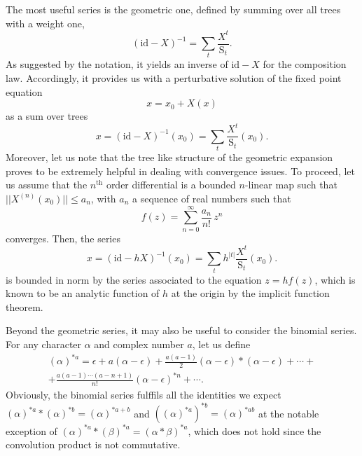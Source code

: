 \documentclass[12pt,here,feynmf]{article}
\begin{document}
The most useful series is the geometric one, defined by summing over all trees with a weight one, 
\begin{equation}
(\mathrm{id}-X)^{-1}=\sum_{t}\frac{X^{t}}{\mathrm{S}_{t}}. \label{geometrictree}
\end{equation}
As suggested by the notation, it yields an inverse of $\mathrm{id}-X$ for the composition law. Accordingly, it provides us with a perturbative solution of the fixed point equation
\begin{equation}
x=x_{0}+X(x)\label{fixedpoint}
\end{equation}
as a sum over trees
\begin{equation}
 x=(\mathrm{id}-X)^{-1}(x_{0})=\sum_{t}\frac{X^{t}}{\mathrm{S}_{t}}(x_{0}).
\end{equation}
Moreover, let us note that the tree like structure of the geometric expansion proves to be extremely helpful in dealing with convergence issues. To proceed, let us assume that the $n^{\mathrm{th}}$ order differential is  a bounded $n$-linear map such that $||X^{(n)}(x_{0})||\leq a_{n}$, with $a_{n}$ a sequence of real numbers such that
\begin{equation}
f(z)=\sum_{n=0}^{\infty}\frac{a_{n}}{n!}\,z^{n}
\end{equation}
converges. Then, the series 
\begin{equation}
 x=(\mathrm{id}-hX)^{-1}(x_{0})=\sum_{t}h^{|t|}\frac{X^{t}}{\mathrm{S}_{t}}(x_{0}).
\end{equation}
is bounded in norm by the series associated to the equation $z=hf(z)$, which is known to be an analytic function of $h$ at the origin by the implicit function theorem. 

Beyond the geometric series, it may also be useful to consider the binomial series.  For any character $\alpha$ and complex number $a$, let us define
\begin{multline}
(\alpha)^{\ast a}=\epsilon+
a(\alpha\!-\!\epsilon)+\frac{a(a-1)}{2}(\alpha\!-\!\epsilon)\ast(\alpha\!-\!\epsilon)+\cdots+\\
+ \frac{a(a-1)\cdots(a-n+1)}{n!}(\alpha\!-\!\epsilon)^{\ast n}+\cdots.\label{binomial}
\end{multline}
Obviously, the binomial series fulffils all the identities we expect
$(\alpha)^{\ast a}\ast(\alpha)^{\ast b}=(\alpha)^{\ast a+b}$ and $((\alpha)^{\ast a})^{\ast b}=(\alpha)^{\ast ab}$ at the notable exception of $(\alpha)^{\ast a}\ast (\beta)^{\ast a}=(\alpha\ast\beta)^{\ast a}$, which does not hold since  the convolution product is not commutative.  
\end{document}
